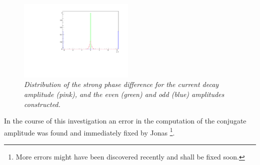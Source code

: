 \begin{figure}[!h]
\vspace*{-0.cm}
  \begin{center}
 \includegraphics[width=0.49\textwidth]{phases.pdf}
  \vspace*{-0.5cm}
  \end{center}
  \caption{\textit{Distribution of the strong phase difference for the current \Dz decay amplitude (pink), and the \CP even (green) and \CP odd (blue) amplitudes constructed.}}
  \label{fig:siggen}
\end{figure}
In the course of this investigation an error in the computation of the \CP conjugate amplitude was found and immediately fixed by Jonas \footnote{More errors might have been discovered recently and shall be fixed soon.}.\\


